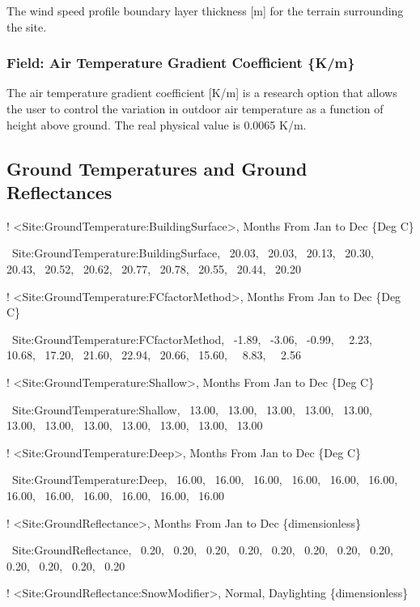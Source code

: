 The wind speed profile boundary layer thickness {[}m{]} for the terrain surrounding the site.

\subsubsection{Field: Air Temperature Gradient Coefficient \{K/m\}}\label{field-air-temperature-gradient-coefficient-km}

The air temperature gradient coefficient {[}K/m{]} is a research option that allows the user to control the variation in outdoor air temperature as a function of height above ground. The real physical value is 0.0065 K/m.

\subsection{Ground Temperatures and Ground Reflectances}\label{ground-temperatures-and-ground-reflectances}

! \textless{}Site:GroundTemperature:BuildingSurface\textgreater{}, Months From Jan to Dec \{Deg C\}

~Site:GroundTemperature:BuildingSurface,~ 20.03,~ 20.03,~ 20.13,~ 20.30,~ 20.43,~ 20.52,~ 20.62,~ 20.77,~ 20.78,~ 20.55,~ 20.44,~ 20.20

! \textless{}Site:GroundTemperature:FCfactorMethod\textgreater{}, Months From Jan to Dec \{Deg C\}

~Site:GroundTemperature:FCfactorMethod,~ -1.89,~ -3.06,~ -0.99,~~ 2.23,~ 10.68,~ 17.20,~ 21.60,~ 22.94,~ 20.66,~ 15.60,~~ 8.83,~~ 2.56

! \textless{}Site:GroundTemperature:Shallow\textgreater{}, Months From Jan to Dec \{Deg C\}

~Site:GroundTemperature:Shallow,~ 13.00,~ 13.00,~ 13.00,~ 13.00,~ 13.00,~ 13.00,~ 13.00,~ 13.00,~ 13.00,~ 13.00,~ 13.00,~ 13.00

! \textless{}Site:GroundTemperature:Deep\textgreater{}, Months From Jan to Dec \{Deg C\}

~Site:GroundTemperature:Deep,~ 16.00,~ 16.00,~ 16.00,~ 16.00,~ 16.00,~ 16.00,~ 16.00,~ 16.00,~ 16.00,~ 16.00,~ 16.00,~ 16.00

! \textless{}Site:GroundReflectance\textgreater{}, Months From Jan to Dec \{dimensionless\}

~Site:GroundReflectance,~ 0.20,~ 0.20,~ 0.20,~ 0.20,~ 0.20,~ 0.20,~ 0.20,~ 0.20,~ 0.20,~ 0.20,~ 0.20,~ 0.20

! \textless{}Site:GroundReflectance:SnowModifier\textgreater{}, Normal, Daylighting \{dimensionless\}

